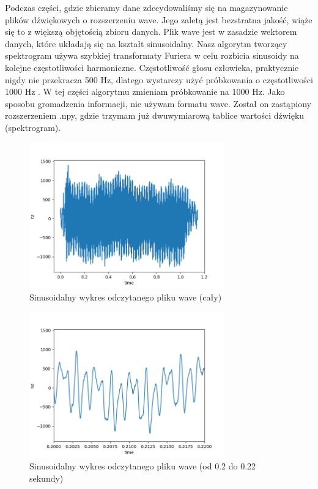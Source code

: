 \documentclass[a4paper,12pt]{extarticle}
\begin{document}
Podczas części, gdzie zbieramy dane zdecydowaliśmy się na magazynowanie plików dźwiękowych o rozszerzeniu wave. Jego zaletą jest bezstratna jakość, wiąże się to z większą objętością zbioru danych. Plik wave jest w zasadzie wektorem danych, które układają się na kształt sinusoidalny. Nasz algorytm tworzący spektrogram używa szybkiej transformaty Furiera w celu rozbicia sinusoidy na kolejne częstotliwości harmoniczne. Częstotliwość głosu człowieka, praktycznie nigdy nie przekracza 500 Hz, dlatego wystarczy użyć próbkowania o częstotliwości 1000 Hz \cite{aliasing}. W tej części algorytmu zmieniam próbkowanie na 1000 Hz. Jako sposobu gromadzenia informacji, nie używam formatu wave. Został on zastąpiony rozszerzeniem .npy, gdzie trzymam już dwuwymiarową tablice wartości dźwięku (spektrogram).

\clearpage

\begin{figure}[h!]
\centering
\includegraphics[width=0.75\textwidth]{wave-wide}
\caption{Sinusoidalny wykres odczytanego pliku wave (cały)}
\end{figure}

\begin{figure}[h!]
\centering
\includegraphics[width=0.75\textwidth]{wave-narrow}
\caption{Sinusoidalny wykres odczytanego pliku wave (od 0.2 do 0.22 sekundy)}
\end{figure}
\end{document}
